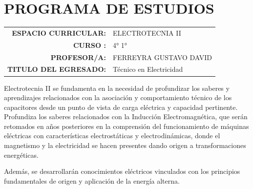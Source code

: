 \documentclass[planificacion2024.tex]{subfiles}
\begin{document}
\section*{\centering PROGRAMA DE ESTUDIOS}

\vspace{2cm}
\begin{tabular}{r l}
\textbf{ESPACIO CURRICULAR:}& ELECTROTECNIA II\\
\textbf{CURSO :}& 4° 1°\\
\textbf{PROFESOR/A:}    & FERREYRA GUSTAVO DAVID \\
\textbf{TITULO DEL EGRESADO:}&Técnico en Electricidad
\end{tabular}

\vspace{1cm}

Electrotecnia II se fundamenta en la necesidad de profundizar 
los saberes y aprendizajes relacionados con la asociación y comportamiento técnico de los capacitores desde un punto de vista de carga eléctrica y capacidad pertinente. 
Profundiza los saberes relacionados con la Inducción Electromagnética, que serán retomados en años posteriores en la comprensión del funcionamiento de máquinas eléctricas con características electrostáticas y electrodinámicas, donde el magnetismo y la electricidad se hacen presentes dando origen a transformaciones energéticas. 

Además, se desarrollarán conocimientos eléctricos vinculados con los principios fundamentales de origen y aplicación de la energía alterna. 
\end{document}
